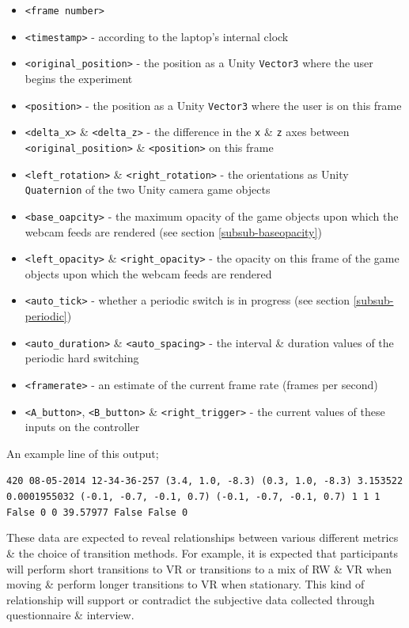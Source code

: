 \documentclass[oneside]{book}
\begin{document}
\begin{itemize}
	\item \texttt{<frame number>}
	\item \texttt{<timestamp>} - according to the laptop's internal clock
	\item \texttt{<original\_position>} - the position as a Unity \texttt{Vector3} where the user begins the experiment
	\item \texttt{<position>} - the position as a Unity \texttt{Vector3} where the user is on this frame
	\item \texttt{<delta\_x>} \& \texttt{<delta\_z>} - the difference in the \texttt{x} \& \texttt{z} axes between \texttt{<original\_position>} \& \texttt{<position>} on this frame
	\item \texttt{<left\_rotation>} \& \texttt{<right\_rotation>} - the orientations as Unity \texttt{Quaternion} of the two Unity camera game objects
	\item \texttt{<base\_oapcity>} - the maximum opacity of the game objects upon which the webcam feeds are rendered (see section \ref{subsub-baseopacity})
	\item \texttt{<left\_opacity>} \& \texttt{<right\_opacity>} - the opacity on this frame of the game objects upon which the webcam feeds are rendered
	\item \texttt{<auto\_tick>} - whether a periodic switch is in progress (see section \ref{subsub-periodic})
	\item \texttt{<auto\_duration>} \& \texttt{<auto\_spacing>} - the interval \& duration values of the periodic hard switching
	\item \texttt{<framerate>} - an estimate of the current frame rate (frames per second)
	\item \texttt{<A\_button>}, \texttt{<B\_button>} \& \texttt{<right\_trigger>} - the current values of these inputs on the controller
\end{itemize}

\vspace{4mm}

An example line of this output;

\begin{center}
	\texttt{420	08-05-2014 12-34-36-257	(3.4, 1.0, -8.3)	(0.3, 1.0, -8.3)	3.153522	0.0001955032	(-0.1, -0.7, -0.1, 0.7)	(-0.1, -0.7, -0.1, 0.7)	1	1	1	False	0	0	39.57977	False	False	0}
\end{center}

These data are expected to reveal relationships between various different metrics \& the choice of transition methods. For example, it is expected that participants will perform short transitions to VR or transitions to a mix of RW \& VR when moving \& perform longer transitions to VR when stationary. This kind of relationship will support or contradict the subjective data collected through questionnaire \& interview.
\end{document}
